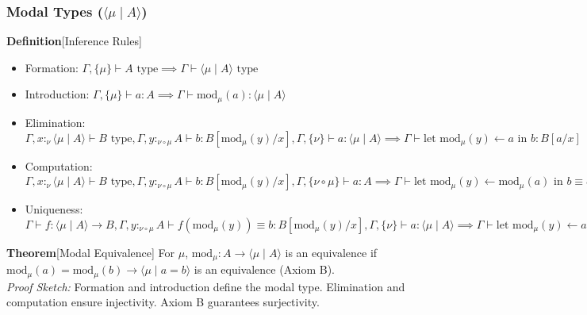 \documentclass{article}
\begin{document}
\subsubsection{Modal Types ($\langle \mu \mid A \rangle$)}
\textbf{Definition}[Inference Rules]
\begin{itemize}
    \item Formation: $\Gamma, \{\mu\} \vdash A \text{ type} \implies \Gamma \vdash \langle \mu \mid A \rangle \text{ type}$
    \item Introduction: $\Gamma, \{\mu\} \vdash a : A \implies \Gamma \vdash \text{mod}_\mu(a) : \langle \mu \mid A \rangle$
    \item Elimination: $\Gamma, x :_\nu \langle \mu \mid A \rangle \vdash B \text{ type}, \Gamma, y :_{\nu \circ \mu} A \vdash b : B[\text{mod}_\mu(y) / x], \Gamma, \{\nu\} \vdash a : \langle \mu \mid A \rangle \implies \Gamma \vdash \text{let } \text{mod}_\mu(y) \leftarrow a \text{ in } b : B[a / x]$
    \item Computation: $\Gamma, x :_\nu \langle \mu \mid A \rangle \vdash B \text{ type}, \Gamma, y :_{\nu \circ \mu} A \vdash b : B[\text{mod}_\mu(y) / x], \Gamma, \{\nu \circ \mu\} \vdash a : A \implies \Gamma \vdash \text{let } \text{mod}_\mu(y) \leftarrow \text{mod}_\mu(a) \text{ in } b \equiv b[a / y] : B[\text{mod}_\mu(a) / x]$
    \item Uniqueness: $\Gamma \vdash f : \langle \mu \mid A \rangle \to B, \Gamma, y :_{\nu \circ \mu} A \vdash f(\text{mod}_\mu(y)) \equiv b : B[\text{mod}_\mu(y) / x], \Gamma, \{\nu\} \vdash a : \langle \mu \mid A \rangle \implies \Gamma \vdash \text{let } \text{mod}_\mu(y) \leftarrow a \text{ in } b \text{ unique up to } \equiv$
\end{itemize}

\textbf{Theorem}[Modal Equivalence]
For $\mu$, $\text{mod}_\mu : A \to \langle \mu \mid A \rangle$ is an equivalence if $\text{mod}_\mu(a) = \text{mod}_\mu(b) \to \langle \mu \mid a = b \rangle$ is an equivalence (Axiom B). \\
\textit{Proof Sketch:} Formation and introduction define the modal type. Elimination and computation ensure injectivity. Axiom B guarantees surjectivity.
\end{document}
